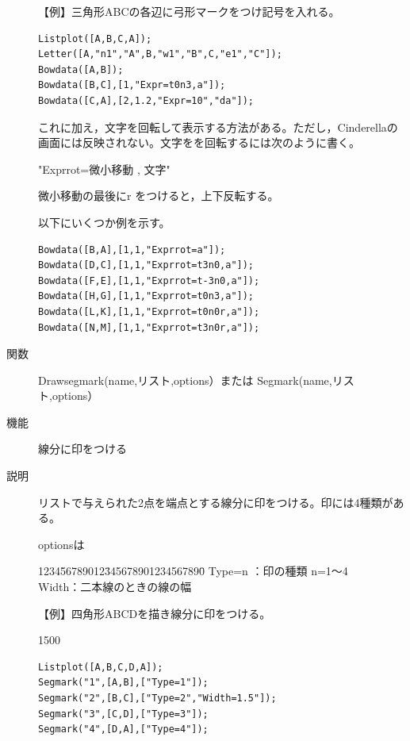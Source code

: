 \documentclass[papersize,a4paper,12pt,uplatex]{jsarticle}
\begin{document}
\begin{description}
【例】三角形ABCの各辺に弓形マークをつけ記号を入れる。
\begin{verbatim}
Listplot([A,B,C,A]);
Letter([A,"n1","A",B,"w1","B",C,"e1","C"]);
Bowdata([A,B]);
Bowdata([B,C],[1,"Expr=t0n3,a"]);
Bowdata([C,A],[2,1.2,"Expr=10","da"]);
\end{verbatim}

\vspace{\baselineskip}
これに加え，文字を回転して表示する方法がある。ただし，Cinderellaの画面には反映されない。文字をを回転するには次のように書く。

\hspace{10mm}"Exprrot=微小移動 , 文字"

 微小移動の最後にr をつけると，上下反転する。
 
以下にいくつか例を示す。
\begin{verbatim}
Bowdata([B,A],[1,1,"Exprrot=a"]);
Bowdata([D,C],[1,1,"Exprrot=t3n0,a"]);
Bowdata([F,E],[1,1,"Exprrot=t-3n0,a"]);
Bowdata([H,G],[1,1,"Exprrot=t0n3,a"]);
Bowdata([L,K],[1,1,"Exprrot=t0n0r,a"]);
Bowdata([N,M],[1,1,"Exprrot=t3n0r,a"]);
\end{verbatim}
\hspace{10mm} \scalebox{0.7}{}


\hypertarget{drawsegmark}{}
\item[関数]Drawsegmark(name,リスト,options）または Segmark(name,リスト,options）
\item[機能]線分に印をつける
\item[説明]リストで与えられた2点を端点とする線分に印をつける。印には4種類がある。

optionsは
\begin{tabbing}
1234\=56789012\=345678901234567890\=\kill
 \> Type=n \>：印の種類 n=1〜4\\
 \> Width\>：二本線のときの線の幅
\end{tabbing}

【例】四角形ABCDを描き線分に印をつける。

\begin{layer}{150}{0}
\end{layer}
\hspace{50mm}
\begin{verbatim}
Listplot([A,B,C,D,A]);
Segmark("1",[A,B],["Type=1"]); 
Segmark("2",[B,C],["Type=2","Width=1.5"]);
Segmark("3",[C,D],["Type=3"]);
Segmark("4",[D,A],["Type=4"]);
\end{verbatim}


\end{description}
\end{document}
